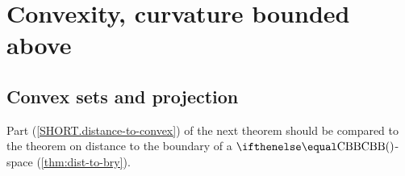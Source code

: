 \chapter{Convexity, curvature bounded above}




\section{Convex sets and projection}



Part (\ref{SHORT.distance-to-convex}) of  the next theorem should be compared to the theorem on distance to the boundary of a $\Alex{}{}$-space (\ref{thm:dist-to-bry}).





